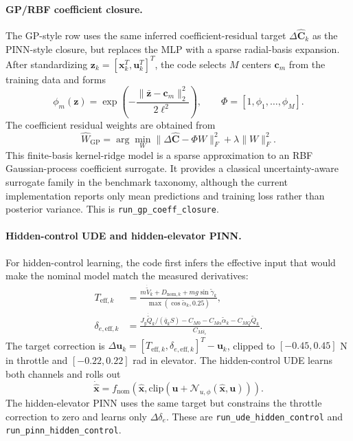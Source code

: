 \documentclass[11pt]{article}
\begin{document}
\paragraph{GP/RBF coefficient closure.}
The GP-style row uses the same inferred coefficient-residual target
$\Delta\widehat{\mathbf{C}}_k$ as the PINN-style closure, but replaces the MLP
with a sparse radial-basis expansion. After standardizing
$\mathbf{z}_k=[\mathbf{x}_k^T,\mathbf{u}_k^T]^T$, the code selects $M$ centers
$\mathbf{c}_m$ from the training data and forms
\begin{equation}
    \phi_m(\mathbf{z})
    =
    \exp\!\left(
        -\frac{\|\bar{\mathbf{z}}-\mathbf{c}_m\|_2^2}{2\ell^2}
    \right),
    \qquad
    \Phi=[1,\phi_1,\ldots,\phi_M].
\end{equation}
The coefficient residual weights are obtained from
\begin{equation}
    \widehat{W}_{\mathrm{GP}}
    =
    \arg\min_W
    \|\Delta\widehat{\mathbf{C}}-\Phi W\|_F^2
    +\lambda\|W\|_F^2.
    \label{eq:code_gp_closure}
\end{equation}
This finite-basis kernel-ridge model is a sparse approximation to an RBF
Gaussian-process coefficient surrogate. It provides a classical
uncertainty-aware surrogate family in the benchmark taxonomy, although the
current implementation reports only mean predictions and training loss rather
than posterior variance. This is \texttt{run\_gp\_coeff\_closure}.

\paragraph{Hidden-control UDE and hidden-elevator PINN.}
For hidden-control learning, the code first infers the effective input that
would make the nominal model match the measured derivatives:
\begin{align}
    T_{\mathrm{eff},k}
    &=
    \frac{
    m\dot{\widetilde{V}}_k
    +D_{\mathrm{nom},k}
    +mg\sin\widetilde{\gamma}_k}
    {\max(\cos\widetilde{\alpha}_k,0.25)},\\
    \delta_{e,\mathrm{eff},k}
    &=
    \frac{
    J_y\dot{\widetilde{Q}}_k/(\bar{q}_kS)
    -C_{M0}-C_{M\alpha}\widetilde{\alpha}_k-C_{MQ}\widetilde{Q}_k}
    {C_{M\delta_e}}.
\end{align}
The target correction is
$\Delta\mathbf{u}_k=[T_{\mathrm{eff},k},\delta_{e,\mathrm{eff},k}]^T
-\mathbf{u}_k$, clipped to $[-0.45,0.45]$ N in throttle and
$[-0.22,0.22]$ rad in elevator. The hidden-control UDE learns both channels and
rolls out
\[
    \dot{\hat{\mathbf{x}}}
    =
    f_{\mathrm{nom}}\!\left(
    \hat{\mathbf{x}},
    \mathrm{clip}(\mathbf{u}+\mathcal{N}_{u,\phi}(\hat{\mathbf{x}},\mathbf{u}))
    \right).
\]
The hidden-elevator PINN uses the same target but constrains the throttle
correction to zero and learns only $\Delta\delta_e$. These are
\texttt{run\_ude\_hidden\_control} and \texttt{run\_pinn\_hidden\_control}.
\end{document}
